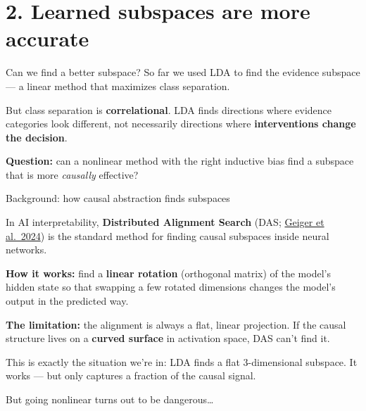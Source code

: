 \documentclass[aspectratio=169,11pt]{beamer}
\begin{document}

\section{2. Learned subspaces are more accurate}\hypertarget{sec:2}{}

\begin{frame}{Can we find a better subspace?}
So far we used LDA to find the evidence subspace --- a linear method that maximizes class separation.

\vspace{0.5em}
But class separation is \textbf{correlational}. LDA finds directions where evidence categories look different, not necessarily directions where \textbf{interventions change the decision}.

\vspace{0.5em}
\textbf{Question:} can a nonlinear method with the right inductive bias find a subspace that is more \emph{causally} effective?
\end{frame}

\begin{frame}{Background: how causal abstraction finds subspaces}

In AI interpretability, \textbf{Distributed Alignment Search} (DAS; \href{https://arxiv.org/abs/2303.02536}{Geiger et al.\ 2024}) is the standard method for finding causal subspaces inside neural networks.

\vspace{0.5em}
\textbf{How it works:} find a \textbf{linear rotation} (orthogonal matrix) of the model's hidden state so that swapping a few rotated dimensions changes the model's output in the predicted way.

\vspace{0.5em}
\textbf{The limitation:} the alignment is always a flat, linear projection. If the causal structure lives on a \textbf{curved surface} in activation space, DAS can't find it.

\vspace{0.5em}
This is exactly the situation we're in: LDA finds a flat 3-dimensional subspace. It works --- but only captures a fraction of the causal signal.

\vspace{0.5em}
But going nonlinear turns out to be dangerous\ldots
\end{frame}
\end{document}
